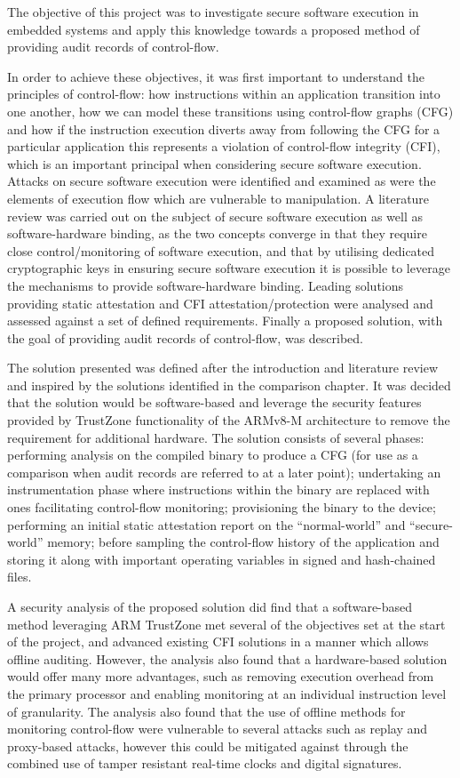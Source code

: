 The objective of this project was to investigate secure software execution in embedded systems and apply this knowledge towards a proposed method of providing audit records of control-flow.

In order to achieve these objectives, it was first important to understand the principles of control-flow: how instructions within an application transition into one another, how we can model these transitions using control-flow graphs (CFG) and how if the instruction execution diverts away from following the CFG for a particular application this represents a violation of control-flow integrity (CFI), which is an important principal when considering secure software execution. Attacks on secure software execution were identified and examined as were the elements of execution flow which are vulnerable to manipulation. A literature review was carried out on the subject of secure software execution as well as software-hardware binding, as the two concepts converge in that they require close control\slash monitoring of software execution, and that by utilising dedicated cryptographic keys in ensuring secure software execution it is possible to leverage the mechanisms to provide software-hardware binding. Leading solutions providing static attestation and CFI attestation\slash protection were analysed and assessed against a set of defined requirements. Finally a proposed solution, with the goal of providing audit records of control-flow, was described.

The solution presented was defined after the introduction and literature review and inspired by the solutions identified in the comparison chapter. It was decided that the solution would be software-based and leverage the security features provided by TrustZone functionality of the ARMv8-M architecture to remove the requirement for additional hardware. The solution consists of several phases: performing analysis on the compiled binary to produce a CFG (for use as a comparison when audit records are referred to at a later point); undertaking an instrumentation phase where instructions within the binary are replaced with ones facilitating control-flow monitoring; provisioning the binary to the device; performing an initial static attestation report on the ``normal-world'' and ``secure-world'' memory; before sampling the control-flow history of the application and storing it along with important operating variables in signed and hash-chained files.

A security analysis of the proposed solution did find that a software-based method leveraging ARM TrustZone met several of the objectives set at the start of the project, and advanced existing CFI solutions in a manner which allows offline auditing. However, the analysis also found that a hardware-based solution would offer many more advantages, such as removing execution overhead from the primary processor and enabling monitoring at an individual instruction level of granularity. The analysis also found that the use of offline methods for monitoring control-flow were vulnerable to several attacks such as replay and proxy-based attacks, however this could be mitigated against through the combined use of tamper resistant real-time clocks and digital signatures.

